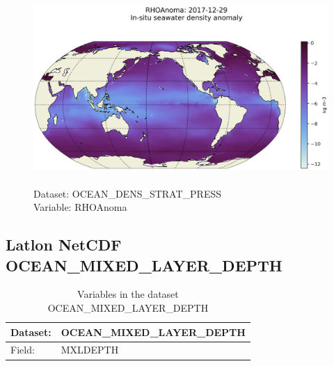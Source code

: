 \begin{figure}[H]
\centering
\includegraphics[scale=0.5]{../images/plots/latlon_plots/Ocean_Density_Stratification_and_Hydrostatic_Pressure/RHOAnoma.png}
\caption{\\Dataset: OCEAN\_DENS\_STRAT\_PRESS\\Variable: RHOAnoma}
\label{tab:table-OCEAN_DENS_STRAT_PRESS_RHOAnoma-Plot}
\end{figure}
\pagebreak
\subsection{Latlon NetCDF OCEAN\_MIXED\_LAYER\_DEPTH}
\newp
\begin{longtable}{|p{}|p{}|}
\caption{Variables in the dataset OCEAN\_MIXED\_LAYER\_DEPTH}
\label{tab:table-OCEAN_MIXED_LAYER_DEPTH-fields} \\ 
\hline \endhead \hline \endfoot
\rowcolor{lightgray} \textbf{Dataset:} & \textbf{OCEAN\_MIXED\_LAYER\_DEPTH} \\ \hline
Field: &MXLDEPTH \\ \hline
\end{longtable}

\pagebreak
